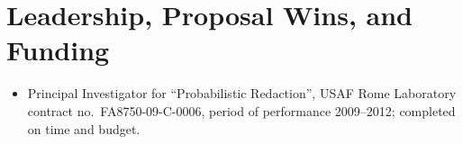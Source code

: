 \vspace{1mm}
\section*{Leadership, Proposal Wins, and Funding}

\vspace{-2mm}
\begin{itemize}
    \item Principal Investigator for ``Probabilistic Redaction'', USAF Rome
        Laboratory contract no.\ FA8750-09-C-0006, period of performance
        2009--2012; completed on time and budget.
\end{itemize}
\vspace{-1mm}
